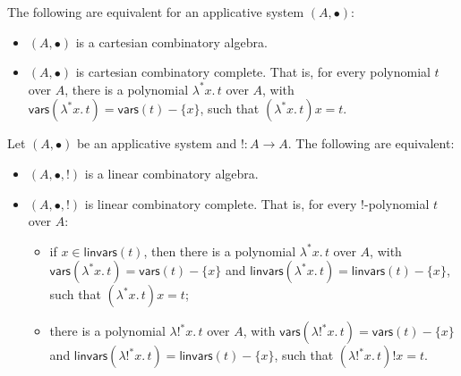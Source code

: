 \documentclass[a4paper,UKenglish,cleveref,numberwithinsect, autoref, thm-restate]{lipics-v2021}
\begin{document}
\begin{proposition}\label{thm:combinatorycompleteness-cartesian}
    The following are equivalent for an applicative system $(A,\bullet)$:
    \begin{itemize}
        \item $(A,\bullet)$ is a cartesian combinatory algebra.
        \item $(A,\bullet)$ is cartesian combinatory complete. That is, for every polynomial $t$ over $A$, there is a polynomial $\lambda^* x.\, t$ over $A$, with $\mathsf{vars}(\lambda^* x.\, t) = \mathsf{vars}(t)-\{x\}$, such that $(\lambda^* x.\, t)x = t$.
    \end{itemize}
\end{proposition}

\begin{proposition}\label{thm:combinatorycompleteness-linear}
    Let $(A,\bullet)$ be an applicative system and $!:A \rightarrow A$. The following are equivalent:
    \begin{itemize}
        \item $(A,\bullet,!)$ is a linear combinatory algebra.
        \item $(A,\bullet,!)$ is linear combinatory complete. That is, for every $!$-polynomial $t$ over $A$:
        \begin{itemize}
            \item if $x\in\mathsf{linvars}(t)$, then there is a polynomial $\lambda^* x.\, t$ over $A$,
            with $\mathsf{vars}(\lambda^* x.\, t) = \mathsf{vars}(t)-\{x\}$
            and $\mathsf{linvars}(\lambda^* x.\, t) = \mathsf{linvars}(t)-\{x\}$,
            such that $(\lambda^* x.\, t)x = t$;
            \item there is a polynomial $\lambda!^* x.\, t$ over $A$,
            with $\mathsf{vars}(\lambda!^* x.\, t) = \mathsf{vars}(t)-\{x\}$
            and $\mathsf{linvars}(\lambda!^* x.\, t) = \mathsf{linvars}(t)-\{x\}$,
            such that $(\lambda!^* x.\, t)!x = t$.
        \end{itemize}
    \end{itemize}
\end{proposition}
\end{document}

